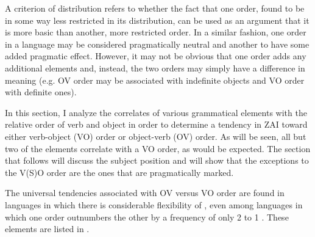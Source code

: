 A criterion of distribution refers to whether the fact that one order, found to be in some way less restricted in its distribution, can be used as an argument that it is more basic than another, more restricted order. In a similar fashion, one order in a language may be considered pragmatically neutral and another to have some added pragmatic effect. However, it may not be obvious that one order adds any additional elements and, instead, the two orders may simply have a difference in meaning (e.g. OV order may be associated with indefinite objects and VO order with definite ones). 


In this section, I analyze the correlates of various grammatical elements with the relative order of verb and object in order to determine a tendency in ZAI toward either verb-object (VO) order or object-verb (OV) order. As will be seen, all but two of the elements correlate with a VO order, as would be expected. The section that follows will discuss the subject position and will show that the exceptions to the V(S)O order are the ones that are pragmatically marked.

The universal tendencies associated with OV versus VO order are found in languages in which there is considerable flexibility of , even among languages in which one order outnumbers the other by a frequency of only 2 to 1 \citep{dryer2007}. These elements are listed in .


